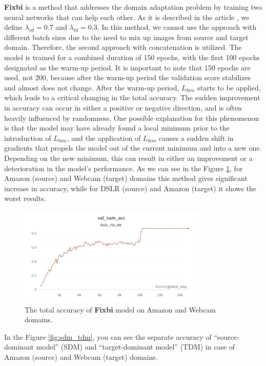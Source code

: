 \textbf{Fixbi} is a method that addresses the domain adaptation problem by training two neural networks that can help each other. As it is described in the article \cite{na2021fixbi}, we define $\lambda_{sd} = 0.7$ and $\lambda_{td} = 0.3$. In this method, we cannot use the approach with different batch sizes due to the need to mix up images from source and target domain. Therefore, the second approach with concatenation is utilized. The model is trained for a combined duration of 150 epochs, with the first 100 epochs designated as the warm-up period. It is important to note that 150 epochs are used, not 200, because after the warm-up period the validation score stabilizes and almost does not change. After the warm-up period, $L_{bim}$ starts to be applied, which leads to a critical changing in the total accuracy. The sudden improvement in accuracy can occur in either a positive or negative direction, and is often heavily influenced by randomness. One possible explanation for this phenomenon is that the model may have already found a local minimum prior to the introduction of $L_{bim}$, and the application of $L_{bim}$ causes a sudden shift in gradients that propels the model out of the current minimum and into a new one. Depending on the new minimum, this can result in either an improvement or a deterioration in the model's performance. As we can see in the Figure \ref{fig:fixbi_total}, for Amazon (source) and Webcam (target) domains this method gives significant increase in accuracy, while for DSLR (source) and Amazon (target) it shows the worst results. 

\begin{figure}[H]
    \centering
    \includegraphics[width=0.8\textwidth]{Figures/Results/fixbi_total.png}
    \caption{The total accuracy of \textbf{Fixbi} model on Amazon and Webcam domains.}
    \label{fig:fixbi_total}
\end{figure}

In the Figure \ref{fig:sdm_tdm}, you can see the separate accuracy of “source-dominant model” (SDM) and “target-dominant model” (TDM) in case of Amazon (source) and Webcam (target) domains.

